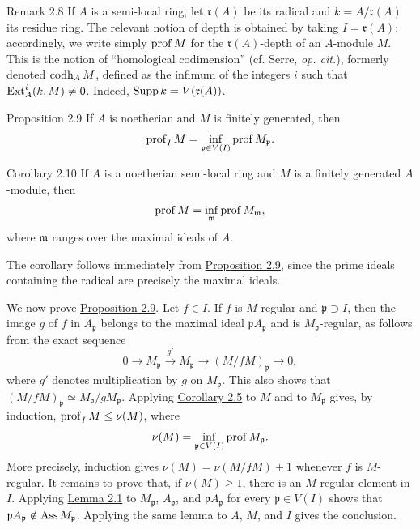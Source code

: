 \begin{sgastatement}{Remark 2.8}
If $A$ is a semi-local ring, let $\mathfrak r(A)$ be its radical and
$k=A/\mathfrak r(A)$ its residue ring. The relevant notion of depth is
obtained by taking $I=\mathfrak r(A)$; accordingly, we write simply
$\operatorname{prof} M$ for the $\mathfrak r(A)$-depth of an $A$-module $M$. This is the
notion of ``homological codimension'' (cf. Serre, \emph{op. cit.}), formerly
denoted $\operatorname{codh}_A M$, defined as the infimum of the integers $i$ such that
$\operatorname{Ext}_A^i(k,M)\ne0$. Indeed, $\operatorname{Supp} k=V(\mathfrak r(A))$.
\end{sgastatement}

\begin{sgastatement}{Proposition 2.9}
If $A$ is noetherian and $M$ is finitely generated, then
\[
  \operatorname{prof}_I M=\inf_{\mathfrak p\in V(I)}\operatorname{prof} M_{\mathfrak p}.
\]
\end{sgastatement}

\begin{sgastatement}{Corollary 2.10}
If $A$ is a noetherian semi-local ring and $M$ is a finitely generated
$A$-module, then
\[
  \operatorname{prof} M=\inf_{\mathfrak m}\operatorname{prof} M_{\mathfrak m},
\]
where $\mathfrak m$ ranges over the maximal ideals of $A$.
\end{sgastatement}

The corollary follows immediately from \hyperref[III.2.9]{Proposition 2.9}, since the prime
ideals containing the radical are precisely the maximal ideals.

We now prove \hyperref[III.2.9]{Proposition 2.9}. Let $f\in I$. If $f$ is $M$-regular and
$\mathfrak p\supset I$, then the image $g$ of $f$ in $A_{\mathfrak p}$
belongs to the maximal ideal $\mathfrak pA_{\mathfrak p}$ and is
$M_{\mathfrak p}$-regular, as follows from the exact sequence
\begin{equation}\label{eq:III.2.3}
  0\longrightarrow M_{\mathfrak p}\xrightarrow{g'}M_{\mathfrak p}
  \longrightarrow(M/fM)_{\mathfrak p}\longrightarrow0,
\end{equation}
where $g'$ denotes multiplication by $g$ on $M_{\mathfrak p}$. This also
shows that $(M/fM)_{\mathfrak p}\simeq M_{\mathfrak p}/gM_{\mathfrak p}$.
Applying \hyperref[III.2.5]{Corollary 2.5} to $M$ and to $M_{\mathfrak p}$ gives, by induction,
$\operatorname{prof}_I M\le\nu(M)$, where
\[
  \nu(M)=\inf_{\mathfrak p\in V(I)}\operatorname{prof} M_{\mathfrak p}.
\]
More precisely, induction gives $\nu(M)=\nu(M/fM)+1$ whenever $f$ is
$M$-regular. It remains to prove that, if $\nu(M)\ge1$, there is an
$M$-regular element in $I$. Applying \hyperref[III.2.1]{Lemma 2.1} to
$M_{\mathfrak p}$, $A_{\mathfrak p}$, and
$\mathfrak pA_{\mathfrak p}$ for every $\mathfrak p\in V(I)$ shows that
$\mathfrak pA_{\mathfrak p}\notin\operatorname{Ass} M_{\mathfrak p}$. Applying the
same lemma to $A$, $M$, and $I$ gives the conclusion.

